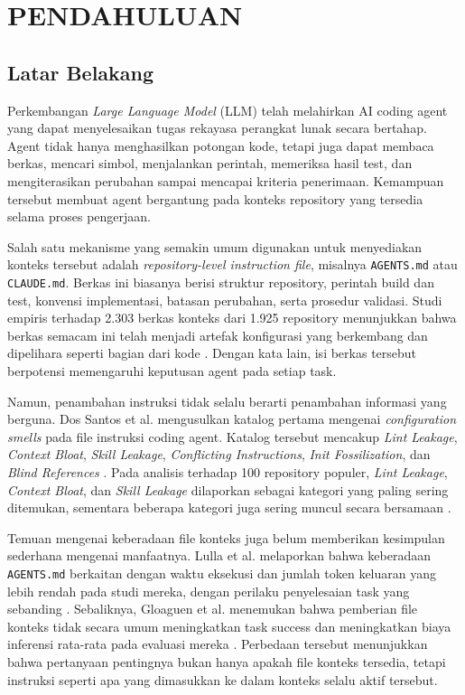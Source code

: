 \chapter{PENDAHULUAN}

\section{Latar Belakang}

Perkembangan \textit{Large Language Model} (LLM) telah melahirkan AI coding agent yang dapat menyelesaikan tugas rekayasa perangkat lunak secara bertahap. Agent tidak hanya menghasilkan potongan kode, tetapi juga dapat membaca berkas, mencari simbol, menjalankan perintah, memeriksa hasil test, dan mengiterasikan perubahan sampai mencapai kriteria penerimaan. Kemampuan tersebut membuat agent bergantung pada konteks repository yang tersedia selama proses pengerjaan.

Salah satu mekanisme yang semakin umum digunakan untuk menyediakan konteks tersebut adalah \textit{repository-level instruction file}, misalnya \texttt{AGENTS.md} atau \texttt{CLAUDE.md}. Berkas ini biasanya berisi struktur repository, perintah build dan test, konvensi implementasi, batasan perubahan, serta prosedur validasi. Studi empiris terhadap 2.303 berkas konteks dari 1.925 repository menunjukkan bahwa berkas semacam ini telah menjadi artefak konfigurasi yang berkembang dan dipelihara seperti bagian dari kode \cite{agentreadmes2025}. Dengan kata lain, isi berkas tersebut berpotensi memengaruhi keputusan agent pada setiap task.

Namun, penambahan instruksi tidak selalu berarti penambahan informasi yang berguna. Dos Santos et al. mengusulkan katalog pertama mengenai \textit{configuration smells} pada file instruksi coding agent. Katalog tersebut mencakup \textit{Lint Leakage}, \textit{Context Bloat}, \textit{Skill Leakage}, \textit{Conflicting Instructions}, \textit{Init Fossilization}, dan \textit{Blind References} \cite{configsmells2026}. Pada analisis terhadap 100 repository populer, \textit{Lint Leakage}, \textit{Context Bloat}, dan \textit{Skill Leakage} dilaporkan sebagai kategori yang paling sering ditemukan, sementara beberapa kategori juga sering muncul secara bersamaan \cite{configsmells2026}.

Temuan mengenai keberadaan file konteks juga belum memberikan kesimpulan sederhana mengenai manfaatnya. Lulla et al. melaporkan bahwa keberadaan \texttt{AGENTS.md} berkaitan dengan waktu eksekusi dan jumlah token keluaran yang lebih rendah pada studi mereka, dengan perilaku penyelesaian task yang sebanding \cite{lulla2026agents}. Sebaliknya, Gloaguen et al. menemukan bahwa pemberian file konteks tidak secara umum meningkatkan task success dan meningkatkan biaya inferensi rata-rata pada evaluasi mereka \cite{gloaguen2026agents}. Perbedaan tersebut menunjukkan bahwa pertanyaan pentingnya bukan hanya apakah file konteks tersedia, tetapi instruksi seperti apa yang dimasukkan ke dalam konteks selalu aktif tersebut.

